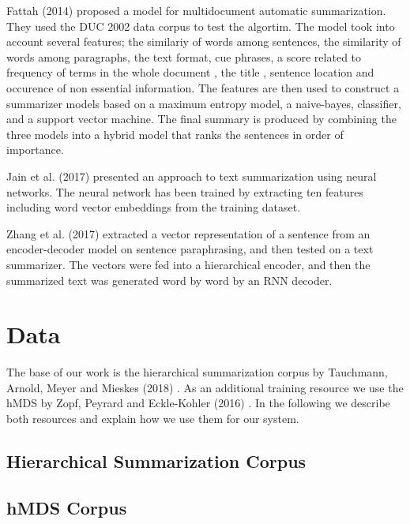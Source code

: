 \documentclass{article}
\begin{document}
Fattah (2014)\citep{Fattah_2014} proposed a model for multidocument automatic summarization. They used the DUC 2002 data corpus to test the algortim. The model took into account several features; the similariy of words among sentences, the similarity of words among paragraphs, the text format, cue phrases, a score related to frequency of terms in the whole document , the title , sentence location and occurence of non essential information. The features are then used to construct a summarizer models based on a maximum entropy model, a naive-bayes, classifier, and a support vector machine. The final summary is produced by combining the three models into a hybrid model that ranks the sentences in order of importance.

Jain et al. (2017)\cite{Jain.et.al.2017} presented an approach to text summarization using neural networks. The neural network has been trained by extracting ten features including word vector embeddings from the training dataset.

Zhang et al. (2017)\cite{zhang2017semantic} extracted a vector representation of a sentence from an
encoder-decoder model on sentence paraphrasing, and then
tested on a text summarizer. The vectors were fed into a hierarchical encoder, and then the summarized text was generated word by word by an RNN decoder. 


\section{Data}
\label{sec:data}

The base of our work is the hierarchical summarization corpus by Tauchmann, Arnold, Meyer and Mieskes (2018) \citep{Tauchmann.et.al.2018.LREC}. As an additional training resource we use the hMDS by Zopf, Peyrard and Eckle-Kohler (2016) \citep{tubiblio97941}. In the following we describe both resources and explain how we use them for our system.

\subsection{Hierarchical Summarization Corpus}



\subsection{hMDS Corpus}


\end{document}
